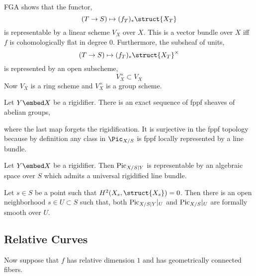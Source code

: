 \documentclass[12pt]{article}
\begin{document}
FGA shows that the functor,
\[ (T \to S) \mapsto (f_T)_* \struct{X_T} \]
is representable by a linear scheme $V_X$ over $X$. This is a vector bundle over $X$ iff $f$ is cohomologically flat in degree $0$. Furthermore, the subsheaf of units,
\[ (T \to S) \mapsto (f_T)_* \struct{X_T}^\times \]
is represented by an open subscheme,
\[ V_X^\times \subset V_X \]
Now $V_X$ is a ring scheme and $V_X^\times$ is a group scheme. 

\begin{prop}
Let $Y \embed X$ be a rigidifier. 
There is an exact sequence of fppf sheaves of abelian groups,
\begin{center}
\end{center}
where the last map forgets the rigidification. It is surjective in the fppf topology because by definition any class in $\Pic_{X/S}$ is fppf locally represented by a line bundle.
\end{prop}

\begin{theorem}[8.3.3]
Let $Y \embed X$ be a rigidifier. Then $\mathrm{Pic}_{X/S|Y}$ is representable by an algebraic space over $S$ which admits a universal rigidified line bundle.
\end{theorem}

\begin{prop}
Let $s \in S$ be a point such that $H^2(X_s, \struct{X_s}) = 0$. Then there is an open neighborhood $s \in U \subset S$ such that, both $\mathrm{Pic}_{X/S|Y}|_U$ and $\mathrm{Pic}_{X/S}|_U$ are formally smooth over $U$.
\end{prop}

\subsection{Relative Curves}

Now suppose that $f$ has relative dimension $1$ and has geometrically connected fibers.
\end{document}

